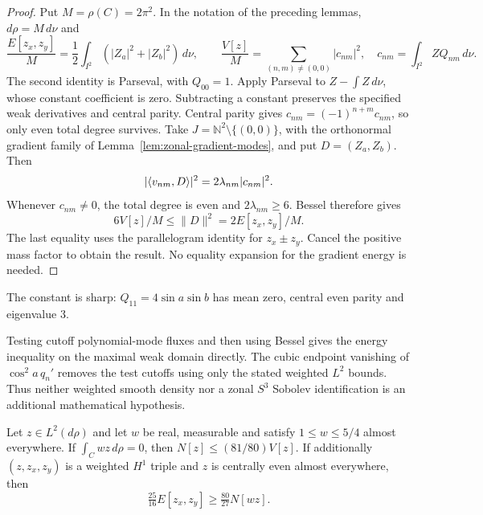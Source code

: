 \begin{proof}
\leanok
Put $M=\rho(C)=2\pi^2$. In the notation of the preceding lemmas,
$d\rho=M\,d\nu$ and
\[
 \frac{E[z_x,z_y]}M
   =\frac12\int_{I^2}(|Z_a|^2+|Z_b|^2)\,d\nu,\qquad
 \frac{V[z]}M=\sum_{(n,m)\ne(0,0)}|c_{nm}|^2,
 \quad c_{nm}=\int_{I^2}ZQ_{nm}\,d\nu.
\]
The second identity is Parseval, with $Q_{00}=1$.
Apply Parseval to $Z-\int Z\,d\nu$, whose constant coefficient is zero.
Subtracting a constant preserves the specified weak derivatives and central
parity. Central parity gives $c_{nm}=(-1)^{n+m}c_{nm}$, so only even
total degree survives.
Take $J=\mathbb N^2\setminus\{(0,0)\}$, with the orthonormal gradient family
of Lemma~\ref{lem:zonal-gradient-modes}, and put $D=(Z_a,Z_b)$.
Then
\[
 |\langle v_{nm},D\rangle|^2=2\lambda_{nm}|c_{nm}|^2.
\]
Whenever $c_{nm}\ne0$, the total degree is even and
$2\lambda_{nm}\ge6$. Bessel therefore gives
\[
 6V[z]/M\le\|D\|^2=2E[z_x,z_y]/M.
\]
The last equality uses the parallelogram identity for $z_x\pm z_y$.
Cancel the positive mass factor to obtain the result.
No equality expansion for the gradient energy is needed.
\end{proof}

\begin{remark}
The constant is sharp: $Q_{11}=4\sin a\sin b$ has mean zero,
central even parity and eigenvalue $3$.
\end{remark}

\begin{remark}
Testing cutoff polynomial-mode fluxes and then using Bessel gives the
energy inequality on the maximal weak domain directly.
The cubic endpoint vanishing of $\cos^2a\,q_n'$ removes the test cutoffs
using only the stated weighted $L^2$ bounds.
Thus neither weighted smooth density nor a zonal $S^3$ Sobolev
identification is an additional mathematical hypothesis.
\end{remark}

\begin{lemma}
\label{lem:dd-constrained-poincare}
\leanok
Let $z\in L^2(d\rho)$ and let $w$ be real, measurable and satisfy
$1\le w\le5/4$ almost everywhere. If $\int_C wz\,d\rho=0$, then
$N[z]\le(81/80)V[z]$.
If additionally $(z,z_x,z_y)$ is a weighted $H^1$ triple and $z$ is
centrally even almost everywhere, then
\[
 \tfrac{25}{16}E[z_x,z_y]\ge\tfrac{80}{27}N[wz].
\]
\end{lemma}

